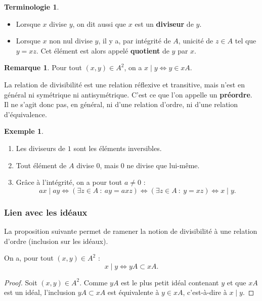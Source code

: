 \documentclass[french]{article}
\theoremstyle{plain}
\theoremstyle{definition}
\newtheorem*{ex}{Exemple}
\newtheorem*{rmq}{Remarque}
\newtheorem*{terminologie}{Terminologie}
\theoremstyle{remark}
\begin{document}
\begin{terminologie}
	\begin{itemize}
		\item Lorsque $x$ divise $y$, on dit aussi que $x$ est un \textbf{diviseur} de $y$.
		\item Lorsque $x$ non nul divise $y$, il y a, par intégrité de $A$, unicité de $z\in A$ tel que $y=xz$. Cet élément est alors appelé \textbf{quotient} de $y$ par $x$.
	\end{itemize}
\end{terminologie}

\begin{rmq}
	Pour tout $(x,y)\in A^2$, on a $x\mid y\iff y\in xA$.
\end{rmq}

La relation de divisibilité est une relation réflexive et transitive, mais n'est en général ni symétrique ni antisymétrique. C'est ce que l'on appelle un \textbf{préordre}. Il ne s'agit donc pas, en général, ni d'une relation d'ordre, ni d'une relation d'équivalence.

\begin{ex}
	\begin{enumerate}
		\item Les diviseurs de $1$ sont les éléments inversibles.
		\item Tout élément de $A$ divise $0$, mais $0$ ne divise que lui-même.
		\item Grâce à l'intégrité, on a pour tout $a\ne0$ :
		$$ax\mid ay\iff (\exists z\in A\ : \ ay=axz)\iff(\exists z\in A\ :\ y=xz)\iff x\mid y.$$
	\end{enumerate}
\end{ex}

\subsubsection*{Lien avec les idéaux}

La proposition suivante permet de ramener la notion de divisibilité à une relation d'ordre (inclusion sur les idéaux).

\begin{prop}%
	On a, pour tout $(x,y)\in A^2$ :
	$$x\mid y\iff yA\subset xA.$$
\end{prop}
\begin{proof}
	Soit $(x,y)\in A^2$. Comme $yA$ est le plus petit idéal contenant $y$ et que $xA$ est un idéal, l'inclusion $yA\subset xA$ est équivalente à $y\in xA$, c'est-à-dire à $x\mid y$.
\end{proof}
\end{document}
